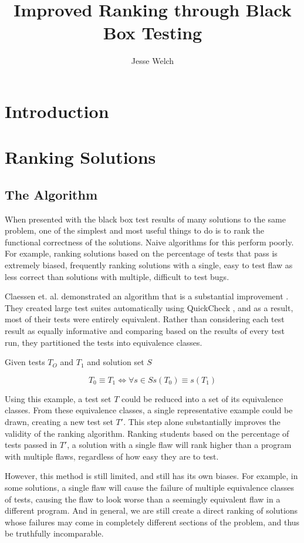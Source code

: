 \documentclass[11pt]{article}
\title{Improved Ranking through Black Box Testing}
\author{Jesse Welch}
\date{}
\begin{document}
\maketitle



\section{Introduction}

\section{Ranking Solutions}
\subsection*{The Algorithm}
When presented with the black box test results of many solutions to the same problem, one of the simplest and most useful things to do is to rank the functional correctness of the solutions. Naive algorithms for this perform poorly. For example, ranking solutions based on the percentage of tests that pass is extremely biased, frequently ranking solutions with a single, easy to test flaw as less correct than solutions with multiple, difficult to test bugs.

Claessen et. al. demonstrated an algorithm that is a substantial improvement \cite{Claessen}. They created large test suites automatically using QuickCheck \cite{QuickCheck}, and as a result, most of their tests were entirely equivalent. Rather than considering each test result as equally informative and comparing based on the results of every test run, they partitioned the tests into equivalence classes.

\centerline{ Given tests $T_O$ and $T_1$ and solution set $S$}
$$ T_0 \equiv T_1 \iff \forall s \in S s(T_0) \equiv s(T_1) $$

Using this example, a test set $T$ could be reduced into a set of its equivalence classes. From these equivalence classes, a single representative example could be drawn, creating a new test set $T\prime$. This step alone substantially improves the validity of the ranking algorithm. Ranking students based on the percentage of tests passed in $T\prime$, a solution with a single flaw will rank higher than a program with multiple flaws, regardless of how easy they are to test.

However, this method is still limited, and still has its own biases. For example, in some solutions, a single flaw will cause the failure of multiple equivalence classes of tests, causing the flaw to look worse than a seemingly equivalent flaw in a different program. And in general, we are still create a direct ranking of solutions whose failures may come in completely different sections of the problem, and thus be truthfully incomparable.
\end{document}
